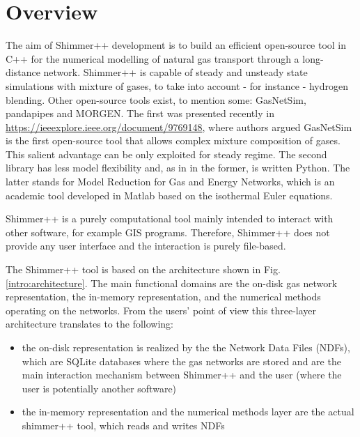 \section{Overview}

The aim of Shimmer++ development is to build an efficient open-source tool in C++ for the numerical modelling of natural gas transport through a long-distance network. Shimmer++ is capable of steady and unsteady state simulations with mixture of gases, to take into account - for instance -  hydrogen blending. Other open-source tools exist, to mention some: GasNetSim, pandapipes and MORGEN. The first was presented recently in \url{https://ieeexplore.ieee.org/document/9769148}, where authors argued GasNetSim is the first open-source tool that allows complex mixture composition of gases. This salient advantage can be only exploited for steady regime. The second library has less model flexibility and, as in in the former, is written Python. The latter stands for Model Reduction for Gas and Energy Networks, which is an academic tool developed in Matlab based on the isothermal Euler equations.   

Shimmer++ is a purely computational tool mainly intended to interact with other software, for example GIS programs. Therefore, Shimmer++ does not provide any user interface and the interaction is purely file-based.

The Shimmer++ tool is based on the architecture shown in Fig. \ref{intro:architecture}. The main functional domains are the on-disk gas network representation, the in-memory representation, and the numerical methods operating on the networks. From the users' point of view this three-layer architecture translates to the following:
\begin{itemize}
    \item the on-disk representation is realized by the the Network Data Files (NDFs), which are SQLite databases where the gas networks are stored and are the main interaction mechanism between Shimmer++ and the user (where the user is potentially another software)
    \item the in-memory representation and the numerical methods layer are the actual shimmer++ tool, which reads and writes NDFs
\end{itemize}

